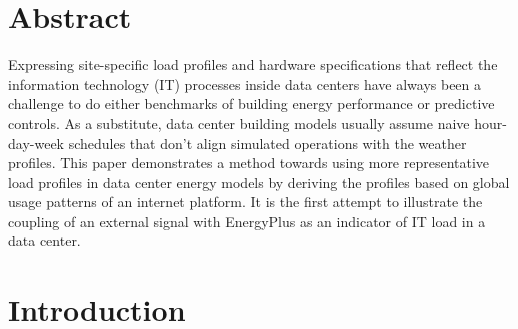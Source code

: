 

\section*{Abstract}	%

\addtocounter{section}{1}


Expressing site-specific load profiles and hardware specifications that reflect the information technology (IT) processes inside data centers have always been a challenge to do either benchmarks of building energy performance or predictive controls. As a substitute, data center building models usually assume naive hour-day-week schedules that don't align simulated operations with the weather profiles. 
This paper demonstrates a method towards using more representative load profiles in data center energy models by deriving the profiles based on global usage patterns of an internet platform. It is the first attempt to illustrate the coupling of an external signal with EnergyPlus as an indicator of IT load in a data center. 

\section{Introduction}

